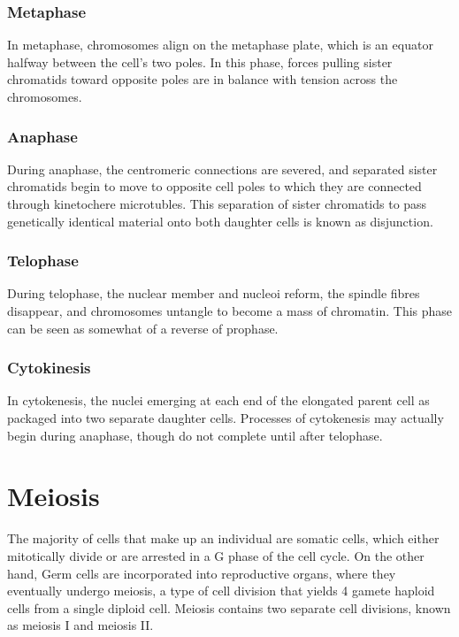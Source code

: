 \documentclass[12pt,titlepage]{article}
\begin{document}
        \subsubsection{Metaphase}
          In metaphase, chromosomes align on the metaphase plate, which is an equator halfway between the cell's two poles. In this phase, forces pulling sister
          chromatids toward opposite poles are in balance with tension across the chromosomes.

        \subsubsection{Anaphase}
          During anaphase, the centromeric connections are severed, and separated sister chromatids begin to move to opposite cell poles to which they are connected
          through kinetochere microtubles. This separation of sister chromatids to pass genetically identical material onto both daughter cells is known as disjunction.

        \subsubsection{Telophase}
          During telophase, the nuclear member and nucleoi reform, the spindle fibres disappear, and chromosomes untangle to become a mass of chromatin. This phase can be
          seen as somewhat of a reverse of prophase.

        \subsubsection{Cytokinesis}
          In cytokenesis, the nuclei emerging at each end of the elongated parent cell as packaged into two separate daughter cells. Processes of cytokenesis may actually
          begin during anaphase, though do not complete until after telophase.

    \section{Meiosis}
      The majority of cells that make up an individual are somatic cells, which either mitotically divide or are arrested in a G phase of the cell cycle. On the other hand,
      Germ cells are incorporated into reproductive organs, where they eventually undergo meiosis, a type of cell division that yields 4 gamete haploid cells from a single
      diploid cell. Meiosis contains two separate cell divisions, known as meiosis I and meiosis II.
\end{document}
